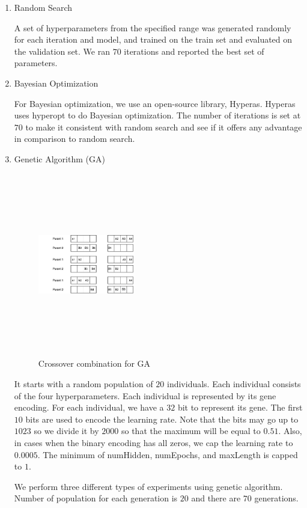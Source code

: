 \documentclass[conference]{IEEEtran}
\begin{document}
\begin{enumerate}
\item Random Search

A set of hyperparameters from the specified range was generated randomly for each iteration and model, and trained on the train set and evaluated on the validation set. We ran $70$ iterations and reported the best set of parameters.


\item Bayesian Optimization

For Bayesian optimization, we use an open-source library, Hyperas\cite{hyperas}. Hyperas uses hyperopt\cite{hyperopt} to do Bayesian optimization. The number of iterations is set at $70$ to make it consistent with random search and see if it offers any advantage in comparison to random search.
\item Genetic Algorithm (GA)
\begin{figure}
\includegraphics[width=0.4\textwidth, height=8cm, keepaspectratio]{GA.png}
\caption{ Crossover combination for GA }
 \label{fig:ga}
\end{figure}

It starts with a random population of $20$ individuals. Each individual consists of the four hyperparameters. Each individual is represented by its gene encoding. For each individual, we have a $32$ bit to represent its gene. The first $10$ bits are used to encode the learning rate. Note that the bits may go up to $1023$ so we divide it by $2000$ so that the maximum will be equal to $0.51$. Also, in cases when the binary encoding has all zeros, we cap the learning rate to $0.0005$. The minimum of numHidden, numEpochs, and maxLength is capped to $1$.

We perform three different types of experiments using genetic algorithm. Number of population for each generation is $20$ and there are $70$ generations. 


\end{enumerate}
\end{document}
